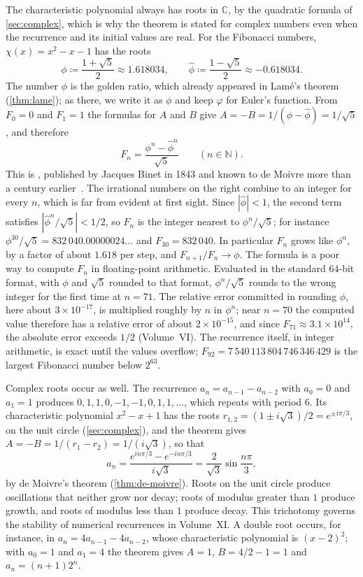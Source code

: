 The characteristic polynomial always has roots in $\mathbb C$, by the quadratic formula of \cref{sec:complex}, which is why the theorem is stated for complex numbers even when the recurrence and its initial values are real. For the Fibonacci numbers, $\chi(x)=x^2-x-1$ has the roots
\[
\phi\coloneqq\frac{1+\sqrt5}{2}\approx1.618034,\qquad\hat\phi\coloneqq\frac{1-\sqrt5}{2}\approx-0.618034 .
\]
The number $\phi$ is the golden ratio, which already appeared in Lam\'e's theorem (\cref{thm:lame}); as there, we write it as $\phi$ and keep $\varphi$ for Euler's function. From $F_0=0$ and $F_1=1$ the formulas for $A$ and $B$ give $A=-B=1/(\phi-\hat\phi)=1/\sqrt5$, and therefore
\begin{equation}
F_n=\frac{\phi^n-\hat\phi^n}{\sqrt5}\qquad(n\in\mathbb N).
\label{eq:binet}
\end{equation}
This is , published by Jacques Binet in 1843 and known to de Moivre more than a century earlier~\cite[Sect.~1.2.8]{knuth1997taocp1}. The irrational numbers on the right combine to an integer for every $n$, which is far from evident at first sight. Since $|\hat\phi|<1$, the second term satisfies $|\hat\phi^n/\sqrt5|<1/2$, so $F_n$ is the integer nearest to $\phi^n/\sqrt5$; for instance $\phi^{30}/\sqrt5=832\,040.00000024\ldots$ and $F_{30}=832\,040$. In particular $F_n$ grows like $\phi^n$, by a factor of about $1.618$ per step, and $F_{n+1}/F_n\to\phi$. The formula is a poor way to compute $F_n$ in floating-point arithmetic. Evaluated in the standard $64$-bit format, with $\phi$ and $\sqrt5$ rounded to that format, $\phi^n/\sqrt5$ rounds to the wrong integer for the first time at $n=71$. The relative error committed in rounding $\phi$, here about $3\times10^{-17}$, is multiplied roughly by $n$ in $\phi^n$; near $n=70$ the computed value therefore has a relative error of about $2\times10^{-15}$, and since $F_{71}\approx3.1\times10^{14}$, the absolute error exceeds $1/2$ (Volume~VI). The recurrence itself, in integer arithmetic, is exact until the values overflow; $F_{92}=7\,540\,113\,804\,746\,346\,429$ is the largest Fibonacci number below $2^{63}$.

Complex roots occur as well. The recurrence $a_n=a_{n-1}-a_{n-2}$ with $a_0=0$ and $a_1=1$ produces $0,1,1,0,-1,-1,0,1,1,\ldots$, which repeats with period $6$. Its characteristic polynomial $x^2-x+1$ has the roots $r_{1,2}=(1\pm i\sqrt3)/2=e^{\pm i\pi/3}$, on the unit circle (\cref{sec:complex}), and the theorem gives $A=-B=1/(r_1-r_2)=1/(i\sqrt3)$, so that
\[
a_n=\frac{e^{in\pi/3}-e^{-in\pi/3}}{i\sqrt3}=\frac{2}{\sqrt3}\sin\frac{n\pi}{3},
\]
by de Moivre's theorem (\cref{thm:de-moivre}). Roots on the unit circle produce oscillations that neither grow nor decay; roots of modulus greater than $1$ produce growth, and roots of modulus less than $1$ produce decay. This trichotomy governs the stability of numerical recurrences in Volume~XI. A double root occurs, for instance, in $a_n=4a_{n-1}-4a_{n-2}$, whose characteristic polynomial is $(x-2)^2$; with $a_0=1$ and $a_1=4$ the theorem gives $A=1$, $B=4/2-1=1$ and $a_n=(n+1)2^n$.

